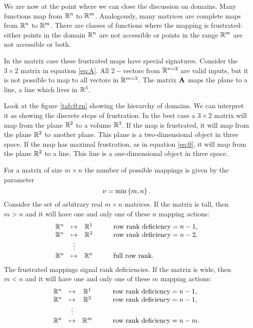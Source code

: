 We are now at the point where we can close the discussion on domains. Many functions map from $\mathbb{R}^{n}$ to $\mathbb{R}^{m}$. Analogously, many matrices are complete maps from $\mathbb{R}^{n}$ to $\mathbb{R}^{m}$. There are classes of functions where the mapping is frustrated: either points in the domain $\mathbb{R}^{n}$ are not accessible or points in the range $\mathbb{R}^{m}$ are not accessible or both. 

In the matrix case these frustrated maps have special signatures. Consider the $3\times2$ matrix in equation \eqref{eq:A}. All $2-$vectors from $\mathbb{R}^{n=2}$ are valid inputs, but it is not possible to map to all vectors in $\mathbb{R}^{m=3}$. The matrix $\textbf{A}^{\mathrm{}}$ maps the plane to a line, a line which lives in $\mathbb{R}^{3}$.

Look at the figure \eqref{tab:0:rn} showing the hierarchy of domains. We can interpret it as showing the discrete steps of frustration. In the best case a $3\times2$ matrix will map from the plane $\mathbb{R}^{2}$ to a volume $\mathbb{R}^{3}$. If the map is frustrated, it will map from the plane $\mathbb{R}^{2}$ to another plane. This plane is a two-dimensional object in three space. If the map has maximal frustration, as in equation \eqref{eq:0}, it will map from the plane $\mathbb{R}^{2}$
to a line. This line is a one-dimensional object in three space.

For a matrix of size $m\times n$ the number of possible mappings is given by the parameter
\begin{equation}
  \nu = \min \left\{ m, n \right\}.
\end{equation}
Consider the set of arbitrary real $m\times n$ matrices. If the matrix is tall, then $m>n$ and it will have one and only one of these $n$ mapping actions:
\begin{equation}
\begin{array}{cccl}
\mathbb{R}^{n} & \mapsto & \mathbb{R}^{1} & \qquad \text{row rank deficiency} = n - 1,\\
\mathbb{R}^{n} & \mapsto & \mathbb{R}^{2} & \qquad \text{row rank deficiency} = n - 2,\\
& \vdots\\
\mathbb{R}^{n} & \mapsto & \mathbb{R}^{n} & \qquad \text{full row rank}.
\end{array}
\end{equation}
The frustrated mappings signal rank deficiencies.
If the matrix is wide, then $m<n$ and it will have one and only one of these $m$ mapping actions:
\begin{equation}
\begin{array}{cccl}
\mathbb{R}^{n} & \mapsto & \mathbb{R}^{1} & \qquad \text{row rank deficiency} = n - 1,\\
\mathbb{R}^{n} & \mapsto & \mathbb{R}^{2} & \qquad \text{row rank deficiency} = n - 1,\\
& \vdots\\
\mathbb{R}^{n} & \mapsto & \mathbb{R}^{m} & \qquad \text{row rank deficiency} = n - m.
\end{array}
\end{equation}


